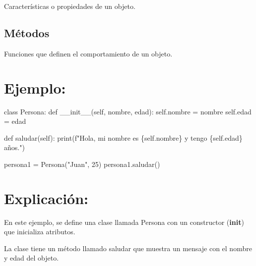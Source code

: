 \documentclass[
  a4paper,
  onepage,
  openany]{scrreprt}
\newenvironment{Shaded}{\begin{snugshade}}{\end{snugshade}}
\newcommand{\BuiltInTok}[1]{\textcolor[rgb]{0.00,0.23,0.31}{#1}}
\newcommand{\DecValTok}[1]{\textcolor[rgb]{0.68,0.00,0.00}{#1}}
\newcommand{\FunctionTok}[1]{\textcolor[rgb]{0.28,0.35,0.67}{#1}}
\newcommand{\KeywordTok}[1]{\textcolor[rgb]{0.00,0.23,0.31}{#1}}
\newcommand{\NormalTok}[1]{\textcolor[rgb]{0.00,0.23,0.31}{#1}}
\newcommand{\OperatorTok}[1]{\textcolor[rgb]{0.37,0.37,0.37}{#1}}
\newcommand{\SpecialCharTok}[1]{\textcolor[rgb]{0.37,0.37,0.37}{#1}}
\newcommand{\SpecialStringTok}[1]{\textcolor[rgb]{0.13,0.47,0.30}{#1}}
\newcommand{\StringTok}[1]{\textcolor[rgb]{0.13,0.47,0.30}{#1}}
\newcommand{\VariableTok}[1]{\textcolor[rgb]{0.07,0.07,0.07}{#1}}
\begin{document}
Características o propiedades de un objeto.

\hypertarget{muxe9todos-1}{%
\subsection{Métodos}\label{muxe9todos-1}}

Funciones que definen el comportamiento de un objeto.

\hypertarget{ejemplo-49}{%
\section{Ejemplo:}\label{ejemplo-49}}

\begin{Shaded}
\begin{Highlighting}[]
\KeywordTok{class}\NormalTok{ Persona:}
    \KeywordTok{def} \FunctionTok{\_\_init\_\_}\NormalTok{(}\VariableTok{self}\NormalTok{, nombre, edad):}
        \VariableTok{self}\NormalTok{.nombre }\OperatorTok{=}\NormalTok{ nombre}
        \VariableTok{self}\NormalTok{.edad }\OperatorTok{=}\NormalTok{ edad}

    \KeywordTok{def}\NormalTok{ saludar(}\VariableTok{self}\NormalTok{):}
        \BuiltInTok{print}\NormalTok{(}\SpecialStringTok{f"Hola, mi nombre es }\SpecialCharTok{\{}\VariableTok{self}\SpecialCharTok{.}\NormalTok{nombre}\SpecialCharTok{\}}\SpecialStringTok{ y tengo }\SpecialCharTok{\{}\VariableTok{self}\SpecialCharTok{.}\NormalTok{edad}\SpecialCharTok{\}}\SpecialStringTok{ años."}\NormalTok{)}

\NormalTok{persona1 }\OperatorTok{=}\NormalTok{ Persona(}\StringTok{"Juan"}\NormalTok{, }\DecValTok{25}\NormalTok{)}
\NormalTok{persona1.saludar()}
\end{Highlighting}
\end{Shaded}

\hypertarget{explicaciuxf3n-49}{%
\section{Explicación:}\label{explicaciuxf3n-49}}

En este ejemplo, se define una clase llamada Persona con un constructor
(\textbf{init}) que inicializa atributos.

La clase tiene un método llamado saludar que muestra un mensaje con el
nombre y edad del objeto.
\end{document}
